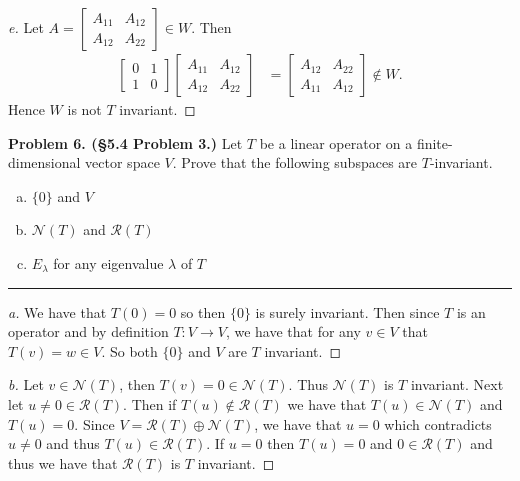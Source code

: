 \documentclass[leqno]{article}
\theoremstyle{nonumberplain}
\newtheorem{proof}{Proof}
\begin{document}
\begin{proof}[e]
Let $A=\begin{bmatrix} A_{11} & A_{12}\\ A_{12} & A_{22}\end{bmatrix} \in W$. Then
\begin{align*}
\begin{bmatrix} 0 & 1\\ 1 & 0\end{bmatrix} \begin{bmatrix} A_{11} & A_{12}\\ A_{12} & A_{22}\end{bmatrix}&=\begin{bmatrix} A_{12} & A_{22}\\ A_{11} & A_{12}\end{bmatrix}\notin W.
\end{align*}
Hence $W$ is not $T$ invariant.
\end{proof}

\pagebreak






\noindent\textbf{Problem 6. (\S 5.4 Problem 3.)} Let $T$ be a linear operator on a finite-dimensional vector space $V$. Prove that the following subspaces are $T$-invariant.
\begin{enumerate}[(a)]
\item $\{0\}$ and $V$
\item $\mathcal{N}(T)$ and $\mathcal{R}(T)$
\item $E_\lambda$ for any eigenvalue $\lambda$ of $T$
\end{enumerate}

\noindent\rule[0.5ex]{\linewidth}{1pt}

\begin{proof}[a]
We have that $T(0)=0$ so then $\{0\}$ is surely invariant. Then since $T$ is an operator and by definition $T\colon V \to V$, we have that for any $v\in V$ that $T(v)=w \in V$. So both $\{0\}$ and $V$ are $T$ invariant.
\end{proof}

\begin{proof}[b]
Let $v\in \mathcal{N}(T)$, then $T(v)=0\in \mathcal{N}(T)$. Thus $\mathcal{N}(T)$ is $T$ invariant.  Next let $u\neq 0 \in \mathcal{R}(T)$. Then if $T(u)\notin \mathcal{R}(T)$ we have that $T(u)\in \mathcal{N}(T)$ and $T(u)=0$. Since $V=\mathcal{R}(T) \oplus \mathcal{N}(T)$, we have that $u=0$ which contradicts $u\neq 0$ and thus $T(u)\in \mathcal{R}(T)$.  If $u=0$ then $T(u)=0$ and $0\in \mathcal{R}(T)$ and thus we have that $\mathcal{R}(T)$ is $T$ invariant.
\end{proof}
\end{document}
